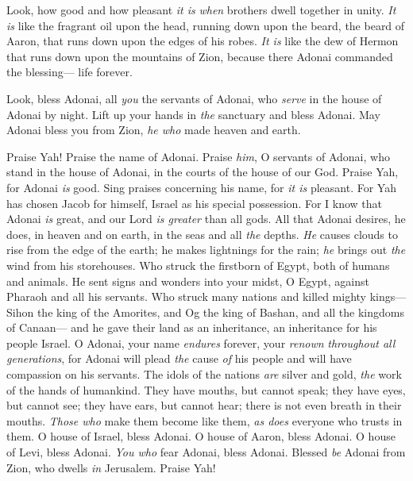 \begin{biblechapter} %
 Look, how good and how pleasant \textit{it is} 
\textit{when} brothers dwell together in unity.
\verse \textit{It is} like the fragrant oil upon the head, 
running down upon the beard, the beard of Aaron, 
that runs down upon the edges of his robes.
\verse \textit{It is} like the dew of Hermon that runs down 
upon the mountains of Zion, 
because there Adonai commanded the blessing— 
life forever.
\end{biblechapter}

\begin{biblechapter} %
 Look, bless Adonai, all \textit{you} the servants of Adonai, 
who \textit{serve} in the house of Adonai by night.
\verse Lift up your hands in \textit{the} sanctuary 
and bless Adonai.
\verse May Adonai bless you from Zion, 
\textit{he who} made heaven and earth.
\end{biblechapter}

\begin{biblechapter} %
 Praise Yah! Praise the name of Adonai. 
Praise \textit{him}, O servants of Adonai,
\verse who stand in the house of Adonai, 
in the courts of the house of our God.
\verse Praise Yah, for Adonai \textit{is} good. 
Sing praises concerning his name, for \textit{it is} pleasant.
\verse For Yah has chosen Jacob for himself, 
Israel as his special possession.
\verse For I know that Adonai \textit{is} great, 
and our Lord \textit{is greater} than all gods.
\verse All that Adonai desires, he does, 
in heaven and on earth, 
in the seas and all \textit{the} depths.
\verse \textit{He} causes clouds to rise from the edge of the earth; 
he makes lightnings for the rain; 
\textit{he} brings out \textit{the} wind from his storehouses.
\verse Who struck the firstborn of Egypt, 
both of humans and animals.
\verse He sent signs and wonders into your midst, O Egypt, 
against Pharaoh and all his servants.
\verse Who struck many nations 
and killed mighty kings—
\verse Sihon the king of the Amorites, 
and Og the king of Bashan, 
and all the kingdoms of Canaan—
\verse and he gave their land as an inheritance, 
an inheritance for his people Israel.
\verse O Adonai, your name \textit{endures} forever, 
your \textit{renown} \textit{throughout all generations},
\verse for Adonai will plead \textit{the} cause \textit{of} his people 
and will have compassion on his servants.
\verse The idols of the nations \textit{are} silver and gold, 
\textit{the} work of the hands of humankind.
\verse They have mouths, but cannot speak; 
they have eyes, but cannot see;
\verse they have ears, but cannot hear; 
there is not even breath in their mouths.
\verse \textit{Those who} make them become like them, 
\textit{as does} everyone who trusts in them.
\verse O house of Israel, bless Adonai. 
O house of Aaron, bless Adonai.
\verse O house of Levi, bless Adonai. 
\textit{You who} fear Adonai, bless Adonai.
\verse Blessed \textit{be} Adonai from Zion, 
who dwells \textit{in} Jerusalem. Praise Yah!
\end{biblechapter}

